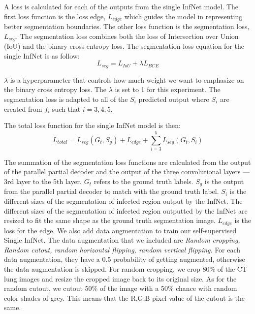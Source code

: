 A loss is calculated for each of the outputs from the single InfNet model. The first loss function is the loss edge, $L_{edge}$ which guides the model in representing better segmentation boundaries. The other loss function is the segmentation loss, ${L_{seg}}$. The segmentation loss combines both the loss of Intersection over Union (IoU) and the binary cross entropy loss. The segmentation loss equation for the single InfNet is as follow:
\begin{equation}
L_{seg} = L_{IoU} + \lambda L_{BCE}
\end{equation}

$\lambda$ is a hyperparameter that controls how much weight we want to emphasize on the binary cross entropy loss. The $\lambda$ is set to 1 for this experiment. The segmentation loss is adapted to all of the ${S_i}$ predicted output where ${S_i}$ are created from $f_i$ such that $i={3,4,5}$. 

The total loss function for the single InfNet model is then:
\begin{equation}
L_{total} = L_{seg}(G_t, S_g) + L_{edge} + 	\sum_{i=3}^{5}L_{seg}(G_t, S_i)
\end{equation}

The summation of the segmentation loss functions are calculated from the output of the parallel partial decoder and the output of the three convolutional layers --- 3rd layer to the 5th layer. $G_t$ refers to the ground truth labels. $S_g$ is the output from the parallel partial decoder to match with the ground truth label. $S_i$ is the different sizes of the segmentation of infected region output by the InfNet. The different sizes of the segmentation of infected region outputted by the InfNet are resized to fit the same shape as the ground truth segmentation image. $L_{edge}$ is the loss for the edge. We also add data augmentation to train our self-supervised Single InfNet. The data augmentation that we included are \textit{Random cropping, Random cutout, random horizontal flipping, random vertical flipping}. For each data augmentation, they have a 0.5 probability of getting augmented, otherwise the data augmentation is skipped. For random cropping, we crop 80\% of the CT lung images and resize the cropped image back to its original size. As for the random cutout, we cutout 50\% of the image with a 50\% chance with random color shades of grey. This means that the R,G,B pixel value of the cutout is the same.

